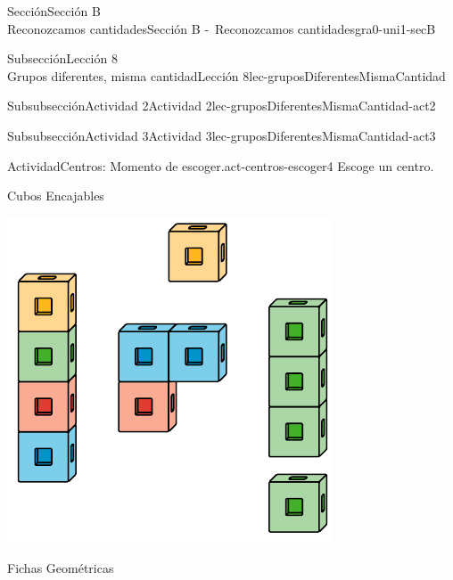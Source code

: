 \begin{sectionptx}{Sección}{{\Large Sección B\\}Reconozcamos cantidades}{}{Sección B -~Reconozcamos cantidades}{}{}{gra0-uni1-secB}
\begin{subsectionptx}{Subsección}{{\normalsize Lección 8\\[-0.05cm]}Grupos diferentes, misma cantidad}{}{Lección 8}{}{}{lec-gruposDiferentesMismaCantidad}
\begin{subsubsectionptx}{Subsubsección}{Actividad 2}{}{Actividad 2}{}{}{lec-gruposDiferentesMismaCantidad-act2}
\end{subsubsectionptx}
%
%
\typeout{************************************************}
\typeout{************************************************}
%
\clearpage
\begin{subsubsectionptx}{Subsubsección}{Actividad 3}{}{Actividad 3}{}{}{lec-gruposDiferentesMismaCantidad-act3}
\begin{activity}{Actividad}{Centros: Momento de escoger.}{act-centros-escoger4}%
Escoge un centro.%
\begin{sidebyside}{2}{0.025}{0.025}{0.05}%
\begin{sbspanel}{0.45}%
Cubos Encajables%
\par
\includegraphics[max width=\linewidth, center]{external/svg-source/tikz-file-128850.pdf}
\end{sbspanel}%
\begin{sbspanel}{0.45}%
Fichas Geométricas%
\par

\end{sbspanel}
\end{sidebyside}
\end{activity}
\end{subsubsectionptx}
\end{subsectionptx}
\end{sectionptx}
